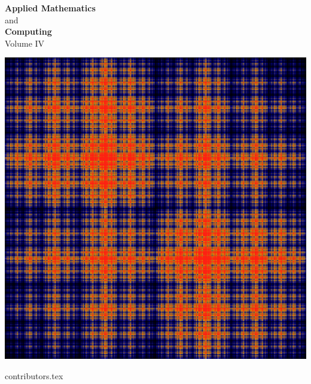\documentclass[nociteref]{newsiambook}
\begin{document}
\thispagestyle{empty}
\begin{center}
{\huge \bf Applied Mathematics} \\ and \\ {\huge \bf Computing} \\
\vspace{5mm}
{\Large Volume IV}
\vspace{20mm}

\includegraphics[scale = .25]{Cover}
\end{center}
\frontmatter

{contributors.tex}

\end{document}
